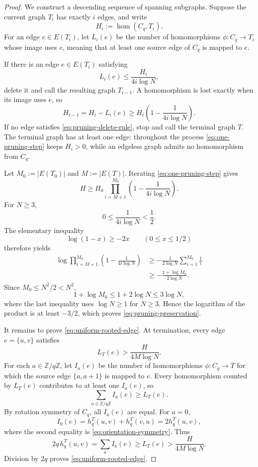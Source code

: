 \documentclass[11pt]{article}
\newcommand{\homn}{\operatorname{hom}}
\newcommand{\1}{\mathbf{1}}
\begin{document}
\begin{proof}
We construct a descending sequence of spanning subgraphs.  Suppose the current
graph $T_i$ has exactly $i$ edges, and write
\[
  H_i:=\homn(C_q,T_i).
\]
For an edge $e\in E(T_i)$, let $L_i(e)$ be the number of homomorphisms
$\phi:C_q\to T_i$ whose image uses $e$, meaning that at least one source edge
of $C_q$ is mapped to $e$.

If there is an edge $e\in E(T_i)$ satisfying
\[
  L_i(e)\le\frac{H_i}{4i\log N},
  \tag{7.7}\label{eq:pruning-delete-rule}
\]
delete it and call the resulting graph $T_{i-1}$.  A homomorphism is lost
exactly when its image uses $e$, so
\[
  H_{i-1}=H_i-L_i(e)
  \ge H_i\left(1-\frac{1}{4i\log N}\right).
  \tag{7.8}\label{eq:one-pruning-step}
\]
If no edge satisfies \eqref{eq:pruning-delete-rule}, stop and call the terminal
graph $T$.  The terminal graph has at least one edge: throughout the process
\eqref{eq:one-pruning-step} keeps $H_i>0$, while an edgeless graph admits no
homomorphism from $C_q$.

Let $M_0:=|E(T_0)|$ and $M:=|E(T)|$.  Iterating
\eqref{eq:one-pruning-step} gives
\[
  H
  \ge
  H_0\prod_{i=M+1}^{M_0}
  \left(1-\frac{1}{4i\log N}\right).
  \tag{7.9}\label{eq:pruning-product}
\]
For $N\ge3$,
\[
  0\le\frac{1}{4i\log N}<\frac12.
\]
The elementary inequality
\[
  \log(1-x)\ge-2x
  \qquad(0\le x\le1/2)
\]
therefore yields
\[
\begin{aligned}
  \log\prod_{i=M+1}^{M_0}
  \left(1-\frac{1}{4i\log N}\right)
  &\ge
  -\frac{1}{2\log N}\sum_{i=1}^{M_0}\frac1i\\
  &\ge
  -\frac{1+\log M_0}{2\log N}.
\end{aligned}
\]
Since $M_0\le N^2/2<N^2$,
\[
  1+\log M_0\le1+2\log N\le3\log N,
\]
where the last inequality uses $\log N\ge1$ for $N\ge3$.  Hence the logarithm
of the product is at least $-3/2$, which proves
\eqref{eq:pruning-preservation}.

It remains to prove \eqref{eq:uniform-rooted-edge}.  At termination, every
edge $e=\{u,v\}$ satisfies
\[
  L_T(e)>\frac{H}{4M\log N}.
  \tag{7.10}\label{eq:terminal-contained-count}
\]
For each $a\in\mathbb{Z}/q\mathbb{Z}$, let $I_a(e)$ be the number of
homomorphisms $\phi:C_q\to T$ for which the source edge $\{a,a+1\}$ is mapped
to $e$.  Every homomorphism counted by $L_T(e)$ contributes to at least one
$I_a(e)$, so
\[
  \sum_{a\in\mathbb{Z}/q\mathbb{Z}}I_a(e)\ge L_T(e).
  \tag{7.11}\label{eq:incidences-dominate-copies}
\]
By rotation symmetry of $C_q$, all $I_a(e)$ are equal.  For $a=0$,
\[
  I_0(e)=h_q^T(u,v)+h_q^T(v,u)=2h_q^T(u,v),
\]
where the second equality is \eqref{eq:orientation-symmetry}.  Thus
\[
  2q\,h_q^T(u,v)
  =\sum_aI_a(e)
  \ge L_T(e)
  >\frac{H}{4M\log N}.
\]
Division by $2q$ proves \eqref{eq:uniform-rooted-edge}.
\end{proof}
\end{document}
